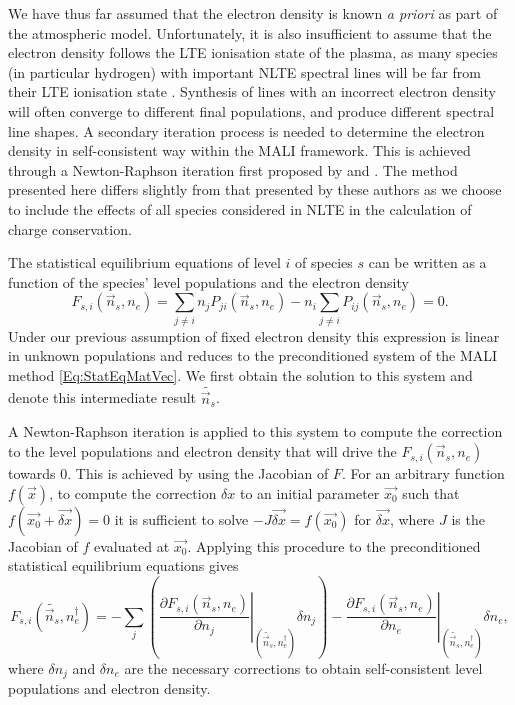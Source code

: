 We have thus far assumed that the electron density is known \emph{a priori} as part of the atmospheric model.
Unfortunately, it is also insufficient to assume that the electron density follows the LTE ionisation state of the plasma, as many species (in particular hydrogen) with important NLTE spectral lines will be far from their LTE ionisation state \citep{Heinzel1995,Paletou1995,Bjorgen2019}.
Synthesis of lines with an incorrect electron density will often converge to different final populations, and produce different spectral line shapes.
A secondary iteration process is needed to determine the electron density in self-consistent way within the MALI framework.
This is achieved through a Newton-Raphson iteration first proposed by \citet{Heinzel1995} and \citet{Paletou1995}.
The method presented here differs slightly from that presented by these authors as we choose to include the effects of all species considered in NLTE in the calculation of charge conservation.

The statistical equilibrium equations of level $i$ of species $s$ can be written as a function of the species' level populations and the electron density
\begin{equation}
    \label{Eq:EseFn}
    F_{s, i}(\vec{n}_s, n_e) = \sum_{j\neq i} n_j P_{ji}(\vec{n}_s, n_e) - n_i\sum_{j\neq i} P_{ij}(\vec{n}_s, n_e) = 0.
\end{equation}
Under our previous assumption of fixed electron density this expression is linear in unknown populations and reduces to the preconditioned system of the MALI method \eqref{Eq:StatEqMatVec}.
We first obtain the solution to this system and denote this intermediate result $\widetilde{\vec{n}_s}$.

A Newton-Raphson iteration is applied to this system to compute the correction to the level populations and electron density that will drive the $F_{s,i}(\vec{n}_s, n_e)$ towards 0.
This is achieved by using the Jacobian of $F$.
For an arbitrary function $f(\vec{x})$, to compute the correction $\delta x$ to an initial parameter $\vec{x_0}$ such that $f(\vec{x_0} + \vec{\delta x}) = 0$ it is sufficient to solve $-J\vec{\delta x} = f(\vec{x_0})$ for $\vec{\delta x}$, where $J$ is the Jacobian of $f$ evaluated at $\vec{x_0}$.
Applying this procedure to the preconditioned statistical equilibrium equations gives
\begin{equation}
    \label{Eq:LinNr}
    F_{s, i}(\widetilde{\vec{n}_s}, n_e^\dagger) =
    - \sum_j \left( \left.\frac{\partial F_{s,i}(\vec{n}_s, n_e)}{\partial n_j}\right\rvert_{(\widetilde{\vec{n}_s}, n_e^\dagger)} \delta n_j \right)
    - \left.\frac{\partial F_{s,i}(\vec{n}_s, n_e)}{\partial n_e}\right\rvert_{(\widetilde{\vec{n}_s}, n_e^\dagger)} \delta n_e,
\end{equation}
where $\delta n_j$ and $\delta n_e$ are the necessary corrections to obtain self-consistent level populations and electron density.

